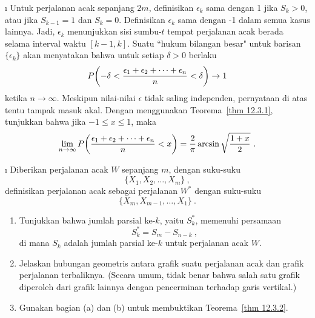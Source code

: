 \exercises
\begin{LJSItem}

\i\label{exer 12.3.1} Untuk perjalanan acak sepanjang $2m$, definisikan
$\epsilon_k$ sama dengan 1 jika $S_k > 0$, atau jika $S_{k-1} = 1$ dan
$S_k = 0$. Definisikan $\epsilon_k$ sama dengan -1 dalam semua kasus lainnya.
Jadi, $\epsilon_k$ menunjukkan sisi sumbu-$t$ tempat perjalanan acak berada
selama interval waktu $[k-1, k]$. Suatu ``hukum bilangan besar" untuk barisan
$\{\epsilon_k\}$ akan menyatakan bahwa untuk setiap $\delta > 0$ berlaku
$$P\biggl(-\delta < {{\epsilon_1 + \epsilon_2 + \cdots + \epsilon_n}\over{n}} < \delta \biggr)
\rightarrow 1$$
ketika $n \rightarrow \infty$. Meskipun nilai-nilai $\epsilon$ tidak saling
independen, pernyataan di atas tentu tampak masuk akal. Dengan menggunakan
Teorema~\ref{thm 12.3.1}, tunjukkan bahwa jika $-1 \le x \le 1$, maka
$$\lim_{n \rightarrow \infty} P\biggl({{\epsilon_1 + \epsilon_2 + \cdots + \epsilon_n}\over{n}}
< x\biggr) = {2\over{\pi}} \arcsin\sqrt{{{1 + x}\over{2}}}\ .$$
 
\i\label{exer 12.3.2} Diberikan perjalanan acak $W$ sepanjang $m$, dengan
suku-suku
\[ \{X_1, X_2, \ldots,X_m\}\ , \]  
\noindent definisikan perjalanan acak  sebagai perjalanan $W^*$
dengan suku-suku
\[ \{X_m, X_{m-1}, \ldots, X_1\}\ . \]  
\begin{enumerate}
\item Tunjukkan bahwa jumlah parsial ke-$k$, yaitu $S^*_k$, memenuhi persamaan
$$S^*_k = S_m - S_{n-k}\ ,$$
di mana $S_k$ adalah jumlah parsial ke-$k$ untuk perjalanan acak $W$.
\item Jelaskan hubungan geometris antara grafik suatu perjalanan acak dan
grafik perjalanan terbaliknya. (Secara umum, tidak benar bahwa salah satu
grafik diperoleh dari grafik lainnya dengan pencerminan terhadap garis
vertikal.)
\item Gunakan bagian (a) dan (b) untuk membuktikan
Teorema~\ref{thm 12.3.2}.
\end{enumerate}

\end{LJSItem}

 
